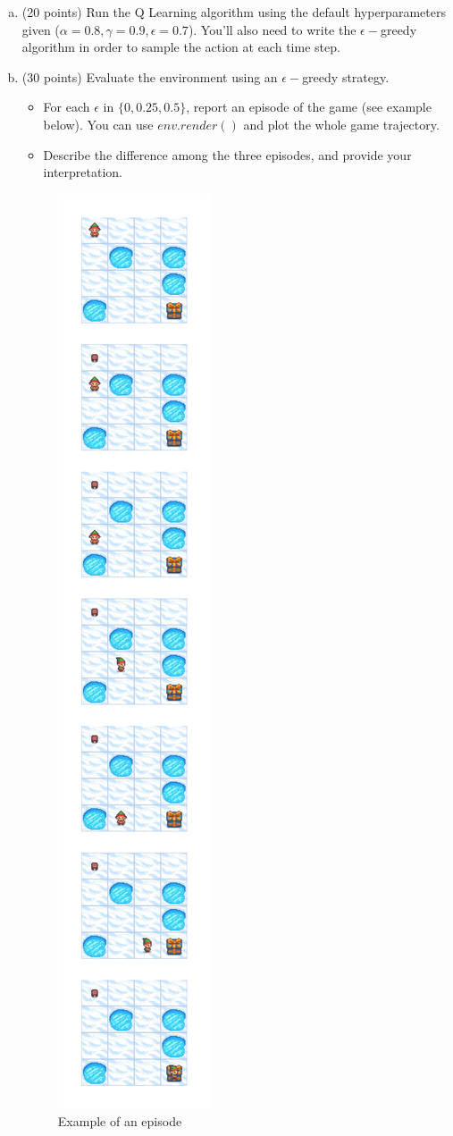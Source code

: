 \documentclass{article}
\begin{document}
\begin{enumerate}[(a)]
    \item (20 points) Run the Q Learning algorithm using the default hyperparameters given ($\alpha=0.8, \gamma=0.9, \epsilon=0.7$). You'll also need to write the $\epsilon-$greedy algorithm in order to sample the action at each time step.
    
    \item (30 points) Evaluate the environment using an $\epsilon-$greedy strategy. 
    		\begin{itemize}
    			\item For each $\epsilon$ in $\{0, 0.25, 0.5\}$, report an episode of the game (see example below). You can use $env.render()$ and plot the whole game trajectory. 
    			\item Describe the difference among the three episodes, and provide your interpretation. \\
    		\end{itemize}
    		
    
    \newpage
    
    \begin{figure}[H]
    	\centering
	    \includegraphics[width=0.25\linewidth]{./example.png}
    	\caption{Example of an episode}
	    \label{fig:q2}
	\end{figure}

    
    
\end{enumerate}
\end{document}
